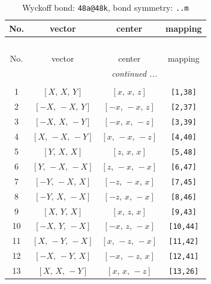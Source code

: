 \documentclass[fleqn,8pt]{jsarticle}
\begin{document}
\begin{longtable}{cccc}
\caption{Wyckoff bond: {\tt 48a@48k}, bond symmetry: {\tt ..m}}
 \\
 \hline \hline
No. & vector & center & mapping \\ \hline \endfirsthead

\multicolumn{3}{l}{\tablename\ \thetable{}} \\
 \hline \hline
No. & vector & center & mapping \\ \hline \endhead

 \hline \hline
\multicolumn{3}{r}{\footnotesize\it continued ...} \\ \endfoot

 \hline \hline
\multicolumn{3}{r}{} \\ \endlastfoot

1 & $\left[ X,\, X,\, Y \right]$ & $\left[ x,\, x,\, z \right]$ & {\tt [1,38]} \\ \hline
2 & $\left[ - X,\, - X,\, Y \right]$ & $\left[ - x,\, - x,\, z \right]$ & {\tt [2,37]} \\ \hline
3 & $\left[ - X,\, X,\, - Y \right]$ & $\left[ - x,\, x,\, - z \right]$ & {\tt [3,39]} \\ \hline
4 & $\left[ X,\, - X,\, - Y \right]$ & $\left[ x,\, - x,\, - z \right]$ & {\tt [4,40]} \\ \hline
5 & $\left[ Y,\, X,\, X \right]$ & $\left[ z,\, x,\, x \right]$ & {\tt [5,48]} \\ \hline
6 & $\left[ Y,\, - X,\, - X \right]$ & $\left[ z,\, - x,\, - x \right]$ & {\tt [6,47]} \\ \hline
7 & $\left[ - Y,\, - X,\, X \right]$ & $\left[ - z,\, - x,\, x \right]$ & {\tt [7,45]} \\ \hline
8 & $\left[ - Y,\, X,\, - X \right]$ & $\left[ - z,\, x,\, - x \right]$ & {\tt [8,46]} \\ \hline
9 & $\left[ X,\, Y,\, X \right]$ & $\left[ x,\, z,\, x \right]$ & {\tt [9,43]} \\ \hline
10 & $\left[ - X,\, Y,\, - X \right]$ & $\left[ - x,\, z,\, - x \right]$ & {\tt [10,44]} \\ \hline
11 & $\left[ X,\, - Y,\, - X \right]$ & $\left[ x,\, - z,\, - x \right]$ & {\tt [11,42]} \\ \hline
12 & $\left[ - X,\, - Y,\, X \right]$ & $\left[ - x,\, - z,\, x \right]$ & {\tt [12,41]} \\ \hline
13 & $\left[ X,\, X,\, - Y \right]$ & $\left[ x,\, x,\, - z \right]$ & {\tt [13,26]} \\ \hline

\end{longtable}
\end{document}
